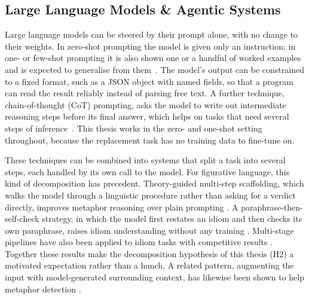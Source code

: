 \subsection{Large Language Models \& Agentic Systems}

Large language models can be steered by their prompt alone, with no change to
their weights. In zero-shot prompting the model is given only an instruction; in
one- or few-shot prompting it is also shown one or a handful of worked examples
and is expected to generalise from them~\cite{Brown2020}.
The model's output can be constrained to a fixed format, such as a JSON object
with named fields, so that a program can read the result reliably instead of
parsing free text. A further technique, chain-of-thought (CoT) prompting, asks the
model to write out intermediate reasoning steps before its final answer, which
helps on tasks that need several steps of inference~\cite{Wei2022}.
This thesis works in the zero- and one-shot setting throughout, because the
replacement task has no training data to fine-tune on.

These techniques can be combined into systems that split a task into several
steps, each handled by its own call to the model. For figurative language, this
kind of decomposition has precedent. Theory-guided multi-step scaffolding, which
walks the model through a linguistic procedure rather than asking for a verdict
directly, improves metaphor reasoning over plain prompting \cite{Tian2024}. A
paraphrase-then-self-check strategy, in which the model first restates an idiom
and then checks its own paraphrase, raises idiom understanding without any
training \cite{Gao2025}. Multi-stage pipelines have also been applied to idiom tasks
with competitive results \cite{Badran2025}. Together these results make the
decomposition hypothesis of this thesis (H2) a motivated expectation rather than
a hunch. A related pattern, augmenting the input with model-generated
surrounding context, has likewise been shown to help metaphor detection
\cite{Hayashi2025}.

